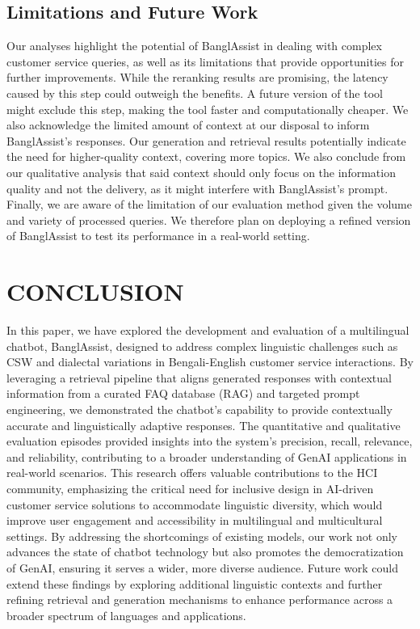 \documentclass[sigconf]{acmart}
\begin{document}
\subsection{Limitations and Future Work}

Our analyses highlight the potential of BanglAssist in dealing with complex customer service queries, as well as its limitations that provide opportunities for further improvements. While the reranking results are promising, the latency caused by this step could outweigh the benefits. A future version of the tool might exclude this step, making the tool faster and computationally cheaper. We also acknowledge the limited amount of context at our disposal to inform BanglAssist's responses. Our generation and retrieval results potentially indicate the need for higher-quality context, covering more topics. We also conclude from our qualitative analysis that said context should only focus on the information quality and not the delivery, as it might interfere with BanglAssist's prompt. Finally, we are aware of the limitation of our evaluation method given the volume and variety of processed queries. We therefore plan on deploying a refined version of BanglAssist to test its performance in a real-world setting.


\section{CONCLUSION}

In this paper, we have explored the development and evaluation of a multilingual chatbot, BanglAssist, designed to address complex linguistic challenges such as CSW and dialectal variations in Bengali-English customer service interactions. By leveraging a retrieval pipeline that aligns generated responses with contextual information from a curated FAQ database (RAG) and targeted prompt engineering, we demonstrated the chatbot's capability to provide contextually accurate and linguistically adaptive responses. The quantitative and qualitative evaluation episodes provided insights into the system's precision, recall, relevance, and reliability, contributing to a broader understanding of GenAI applications in real-world scenarios. This research offers valuable contributions to the HCI community, emphasizing the critical need for inclusive design in AI-driven customer service solutions to accommodate linguistic diversity, which would improve user engagement and accessibility in multilingual and multicultural settings. By addressing the shortcomings of existing models, our work not only advances the state of chatbot technology but also promotes the democratization of GenAI, ensuring it serves a wider, more diverse audience. Future work could extend these findings by exploring additional linguistic contexts and further refining retrieval and generation mechanisms to enhance performance across a broader spectrum of languages and applications.
\end{document}
